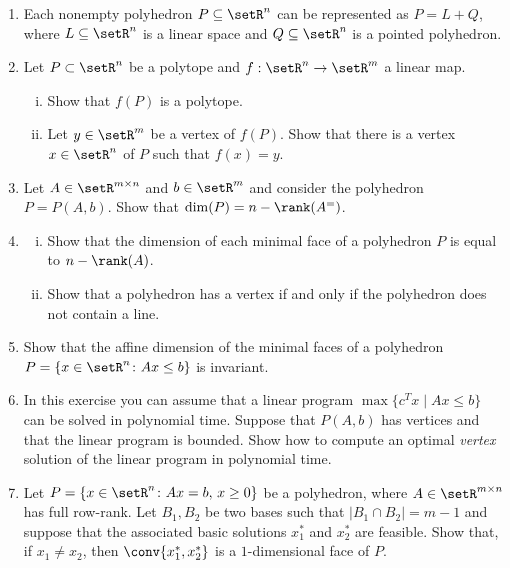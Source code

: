 \begin{enumerate}
\item 
  Each nonempty  polyhedron $P\subseteq\setR^n$ can be represented as $ P = L + Q$,
  where  $L\subseteq\setR^n$ is a linear space and $Q\subseteq\setR^n$ is a pointed
  polyhedron.   \label{po:ex:1}
\item Let $P\subset\setR^n$ be a polytope and $f:\setR^n\to\setR^m$ a linear map.
  \begin{enumerate}[i)]
  \item Show that $f(P)$ is a polytope.
  \item Let $y\in\setR^m$ be a vertex of $f(P)$. Show that there is a vertex $x\in\setR^n$ of $P$
    such that $f(x) = y$.
  \end{enumerate}
\item 
  Let $A \in \setR^{m\times n}$ and $b \in \setR^m$ and consider the polyhedron
  $P = P(A,b)$. Show that $\dim(P) = n - \rank(A^=)$.   \label{po:ex:2}
\item 
  \begin{enumerate}[i)]
  \item 
  Show that the dimension of each minimal face of a polyhedron $P$ is
  equal to $n - \rank(A)$. 
  \item
  Show that a polyhedron has a vertex if and only if the polyhedron
  does not contain a line. 
\end{enumerate}   \label{po:ex:3}
\item Show that the affine  dimension of the minimal faces of a 
  polyhedron $P = \{x \in \setR^n \colon Ax\leq b\}$ is invariant. \label{item:19}
\item 
  In this exercise you can assume that a linear program $\max\{c^Tx \mid
  Ax\leq b \}$ can be solved in polynomial time. Suppose that $P(A,b)$
  has vertices and that the linear program is bounded. Show how to
  compute an optimal \emph{vertex} solution of the linear
  program in polynomial time.    \label{po:ex:4}
\item  Let $P = \{x \in \setR^n \colon Ax = b, \, x\geq0\}$ be a polyhedron,
  where $A \in \setR^{m\times n}$ has full row-rank. Let $B_1,B_2$ be two bases
  such that $|B_1\cap B_2| = m-1$ and suppose that the associated basic
  solutions $x^*_1$ and $x^*_2$ are feasible. Show that, if
  $x_1\neq x_2$, then   $\conv\{x_1^*,x_2^*\}$ is a $1$-dimensional face
  of $P$. \label{item:18} 
\end{enumerate}












